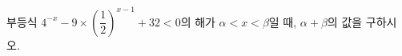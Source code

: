 부등식 $4^{-x}-9\times\left(\dfrac{1}{2}\right)^{x-1}+32<0$의 해가 $\alpha<x<\beta$일 때, $\alpha+\beta$의 값을 구하시오.
